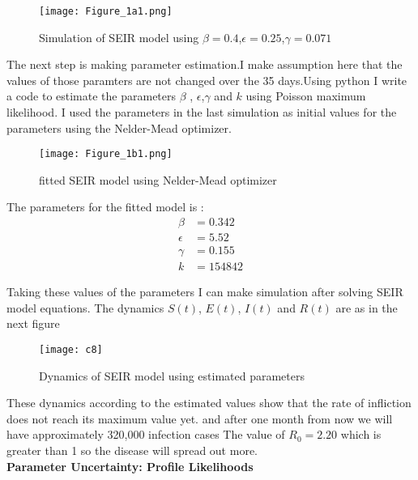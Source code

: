 \documentclass{exam}
\begin{document}
\begin{figure}[H]
	\centering
	\texttt{[image: Figure\_1a1.png]}\\
	\caption{Simulation of SEIR model using $\beta=0.4$,$\epsilon=0.25$,$\gamma=0.071$}
\end{figure}
\newpage
The next step is making parameter estimation.I make assumption here that the values of those paramters are not changed over the 35 days.Using python I write a code to estimate the parameters $\beta$ , $\epsilon$,$\gamma$ and $k$ using Poisson maximum likelihood. I used the parameters in the last simulation as initial values for the parameters using the Nelder-Mead optimizer.
\begin{figure}[H]
	\centering
	\texttt{[image: Figure\_1b1.png]}\\
	\caption{fitted SEIR model using Nelder-Mead optimizer}
\end{figure}
The parameters for the fitted model is :\\
\begin{align*}
\beta &= 0.342\\
\epsilon &=5.52\\
\gamma &= 0.155\\
k &=154842
\end{align*}

Taking these values of the parameters I can make simulation after solving SEIR model equations. 
The dynamics $S(t)$, $E(t)$, $I(t)$ and $R(t)$ are as in the next figure
\begin{figure}[H]
	\centering
	\texttt{[image: c8]}\\
	\caption{Dynamics of SEIR model using estimated parameters}
\end{figure}
These dynamics according to the estimated values show that the rate of infliction does not reach its maximum value yet. and after one month from now we will have approximately 320,000 infection cases  
The value of $R_0 = 2.20$ which is greater than 1 so the disease will spread out more.\\

\textbf{Parameter Uncertainty: Profile Likelihoods} \\
\end{document}
